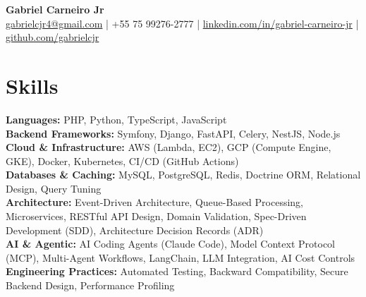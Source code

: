 \documentclass[letterpaper,10pt]{article}
\begin{document}
\begin{center}
    \textbf{\huge Gabriel Carneiro Jr} \\ \vspace{2pt}
    \small
    \href{mailto:gabrielcjr4@gmail.com}{gabrielcjr4@gmail.com} |
    +55 75 99276-2777 |
    \href{https://www.linkedin.com/in/gabriel-carneiro-jr}{linkedin.com/in/gabriel-carneiro-jr} |
    \href{https://github.com/gabrielcjr}{github.com/gabrielcjr}
\end{center}

\section{Skills}
\begin{itemize}[leftmargin=0.15in, label={}]
  \small{\item{
    \textbf{Languages:} PHP, Python, TypeScript, JavaScript \\
    \textbf{Backend Frameworks:} Symfony, Django, FastAPI, Celery, NestJS, Node.js \\
    \textbf{Cloud \& Infrastructure:} AWS (Lambda, EC2), GCP (Compute Engine, GKE), Docker, Kubernetes, CI/CD (GitHub Actions) \\
    \textbf{Databases \& Caching:} MySQL, PostgreSQL, Redis, Doctrine ORM, Relational Design, Query Tuning \\
    \textbf{Architecture:} Event-Driven Architecture, Queue-Based Processing, Microservices, RESTful API Design, Domain Validation, Spec-Driven Development (SDD), Architecture Decision Records (ADR) \\
    \textbf{AI \& Agentic:} AI Coding Agents (Claude Code), Model Context Protocol (MCP), Multi-Agent Workflows, LangChain, LLM Integration, AI Cost Controls \\
    \textbf{Engineering Practices:} Automated Testing, Backward Compatibility, Secure Backend Design, Performance Profiling
  }}
\end{itemize}

\end{document}
